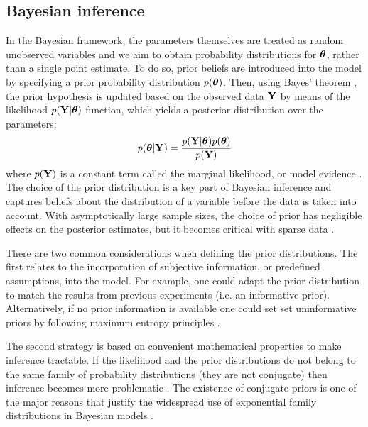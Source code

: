 \subsection{Bayesian inference}  \label{section:bayesian_inference}
In the Bayesian framework, the parameters themselves are treated as random unobserved variables and we aim to obtain probability distributions for $\mbox{\boldmath $\theta$}$, rather than a single point estimate. To do so, prior beliefs are introduced into the model by specifying a prior probability distribution $p(\mbox{\boldmath $\theta$})$. Then, using Bayes' theorem \cite{Bayes1763}, the prior hypothesis is updated based on the observed data ${\bf Y}$ by means of the likelihood $p({\bf Y}|\mbox{\boldmath $\theta$})$ function, which yields a posterior distribution over the parameters:
\[
	p(\mbox{\boldmath $\theta$}|{\bf Y}) = \frac{p({\bf Y}|\mbox{\boldmath $\theta$}) p(\mbox{\boldmath $\theta$})}{p({\bf Y})}
\]
where $p({\bf Y})$ is a constant term called the marginal likelihood, or model evidence \cite{Bishop2006,Murphy}.\\
The choice of the prior distribution is a key part of Bayesian inference and captures beliefs about the distribution of a variable before the data is taken into account. With asymptotically large sample sizes, the choice of prior has negligible effects on the posterior estimates, but it becomes critical with sparse data \cite{Bishop2006,Murphy,Gelman2013}.

There are two common considerations when defining the prior distributions. The first relates to the incorporation of subjective information, or predefined assumptions, into the model. For example, one could adapt the prior distribution to match the results from previous experiments (i.e. an informative prior). Alternatively, if no prior information is available one could set set uninformative priors by following maximum entropy principles \cite{Jaynes1968}.

The second strategy is based on convenient mathematical properties to make inference tractable. If the likelihood and the prior distributions do not belong to the same family of probability distributions (they are not conjugate) then inference becomes more problematic \cite{Raiffa1961,Bishop2006,Murphy,Gelman2013}. The existence of conjugate priors is one of the major reasons that justify the widespread use of exponential family distributions in Bayesian models \cite{Gelman2013}.

